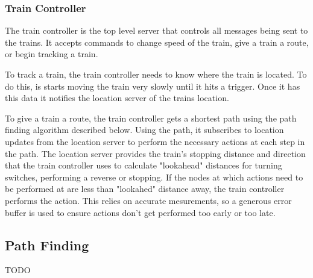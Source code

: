 \documentclass[letterpaper]{article}
\begin{document}
\subsubsection{Train Controller}

The train controller is the top level server that controls all messages being sent to the trains. It accepts commands to change speed of the train, give a train a route, or begin tracking a train. 

To track a train, the train controller needs to know where the train is located. To do this, is starts moving the train very slowly until it hits a trigger. Once it has this data it notifies the location server of the trains location. 

To give a train a route, the train controller gets a shortest path using the path finding algorithm described below. Using the path, it subscribes to location updates from the location server to perform the necessary actions at each step in the path. The location server provides the train's stopping distance and direction that the train controller uses to calculate "lookahead" distances for turning switches, performing a reverse or stopping. If the nodes at which actions need to be performed at are less than "lookahed" distance away, the train controller performs the action. This relies on accurate mesurements, so a generous error buffer is used to ensure actions don't get performed too early or too late.

\subsection{Path Finding}

TODO
\end{document}
